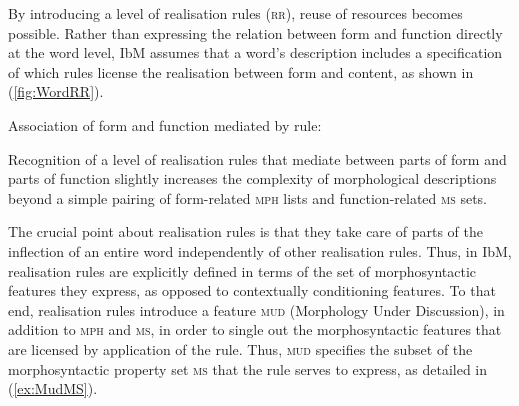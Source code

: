 \documentclass[output=paper,biblatex,babelshorthands,newtxmath,draftmode,colorlinks,citecolor=brown]{langscibook}
\begin{document}
\begin{exe}
\begin{xlist}
By  introducing a level of realisation rules (\textsc{rr}), reuse
of resources becomes possible. Rather than expressing the relation
between form and function directly at the word level, IbM assumes that
a word's description includes a specification of which rules license
the realisation between form and content, as shown in 
(\ref{fig:WordRR}).


\eas
\label{fig:WordRR}%
Association of form and function mediated by rule:\\
%
%
%
\zs

Recognition of a level of realisation rules that mediate between parts
of form and parts of function slightly increases the complexity of
morphological descriptions beyond a simple pairing of form-related
\textsc{mph} lists and function-related \textsc{ms} sets. 

\largerpage
The crucial point about realisation rules is that they take care of
parts of the inflection of an entire word independently of other
realisation rules. Thus, in IbM, realisation rules are explicitly
defined in terms of the set of morphosyntactic features they express,
as opposed to contextually conditioning features. To that end, realisation
rules introduce a feature \textsc{mud} (Morphology Under Discussion),
in addition to \textsc{mph} and \textsc{ms}, in order to single out
the morphosyntactic features that are licensed by application of the
rule. Thus, \textsc{mud} specifies the subset of the morphosyntactic
property set \textsc{ms} that the rule serves to express, as detailed
in (\ref{ex:MudMS}). 


\end{xlist}
\end{exe}
\end{document}
